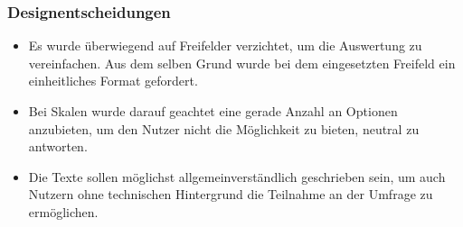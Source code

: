 \documentclass[a4paper]{article}
\begin{document}
			\subsubsection{Designentscheidungen}
			 \begin{itemize}
			     \item Es wurde überwiegend auf Freifelder verzichtet, um die Auswertung zu vereinfachen. Aus dem selben Grund wurde bei dem eingesetzten Freifeld ein einheitliches Format gefordert.
				\item Bei Skalen wurde darauf geachtet eine gerade Anzahl an Optionen anzubieten, um den Nutzer nicht die Möglichkeit zu bieten, neutral zu antworten.
				\item Die Texte sollen möglichst allgemeinverständlich geschrieben sein, um auch Nutzern ohne technischen Hintergrund die Teilnahme an der Umfrage zu ermöglichen.
			 \end{itemize}
			 
\end{document}
